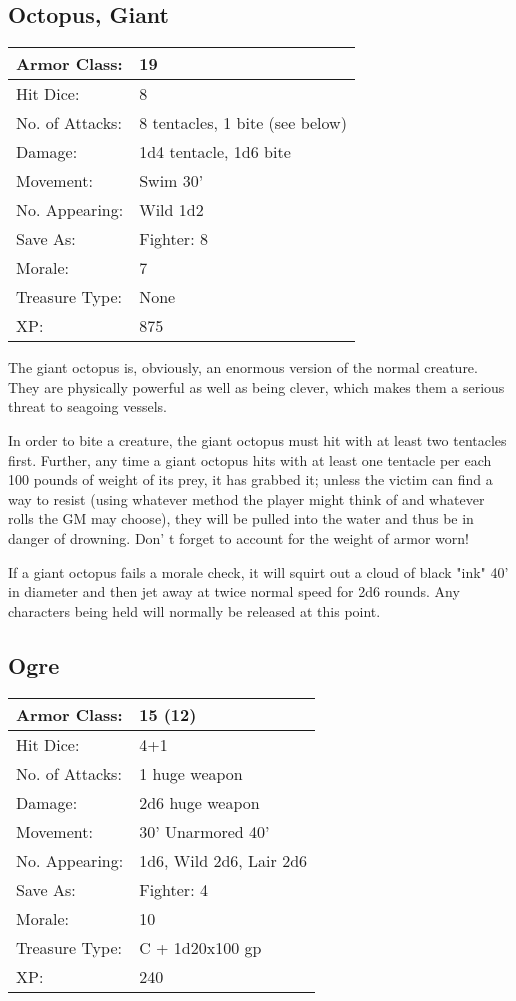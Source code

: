 \documentclass[a4paper,twoside,openany,10pt]{book}
\begin{document}
\begin{multicols}{2}
\subsection*{Octopus, Giant}\label{octopus-giant}

\begin{tabularx}{0.50\textwidth}{@{}lX@{}}
Armor Class: & 19 \\\hline
Hit Dice: & 8 \\\hline
No. of Attacks: & 8 tentacles, 1 bite (see below) \\\hline
Damage: & 1d4 tentacle, 1d6 bite \\\hline
Movement: & Swim 30' \\\hline
No. Appearing: & Wild 1d2 \\\hline
Save As: & Fighter: 8 \\\hline
Morale: & 7 \\\hline
Treasure Type: & None \\\hline
XP: & 875 \\\hline
\end{tabularx}\medskip

The giant octopus is, obviously, an enormous version of the normal creature. They are physically powerful as well as being clever, which makes them a serious threat to seagoing vessels. 

In order to bite a creature, the giant octopus must hit with at least two tentacles first. Further, any time a giant octopus hits with at least one tentacle per each 100 pounds of weight of its prey, it has grabbed it; unless the victim can find a way to resist (using whatever method the player might think of and whatever rolls the GM may choose), they will be pulled into the water and thus be in danger of drowning. Don' t forget to account for the weight of armor worn!

If a giant octopus fails a morale check, it will squirt out a cloud of black "ink" 40' in diameter and then jet away at twice normal speed for 2d6 rounds. Any characters being held will normally be released at this point.

\subsection*{Ogre}\label{ogre}

\begin{tabularx}{0.50\textwidth}{@{}lX@{}}
Armor Class: & 15 (12) \\\hline
Hit Dice: & 4+1 \\\hline
No. of Attacks: & 1 huge weapon \\\hline
Damage: & 2d6 huge weapon \\\hline
Movement: & 30' Unarmored 40' \\\hline
No. Appearing: & 1d6, Wild 2d6, Lair 2d6 \\\hline
Save As: & Fighter: 4 \\\hline
Morale: & 10 \\\hline
Treasure Type: & C + 1d20x100 gp \\\hline
XP: & 240 \\\hline
\end{tabularx}\medskip


\end{multicols}
\end{document}
